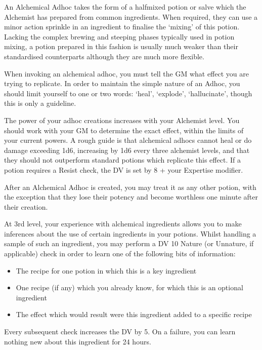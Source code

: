{
	An Alchemical Ad\minus{}hoc takes the form of a half\minus{}mixed potion or salve which the Alchemist has prepared from common ingredients. When required, they can use a minor action sprinkle in an ingredient to finalise the `mixing' of this potion. Lacking the complex brewing and steeping phases typically used in potion mixing, a potion prepared in this fashion is usually much weaker than their standardised counterparts \minus{} although they are much more flexible. 
	
	 When invoking an alchemical ad\minus{}hoc, you must tell the GM what effect you are trying to replicate. In order to maintain the simple nature of an Ad\minus{}hoc, you should limit yourself to one or two words: `heal', `explode', `hallucinate', though this is only a guideline. 
	 
	 The power of your ad\minus{}hoc creations increases with your Alchemist level. You should work with your GM to determine the exact effect, within the limits of your current powers. A rough guide is that alchemical ad\minus{}hocs cannot heal or do damage exceeding 1d6, increasing by 1d6 every three alchemist levels, and that they should not outperform standard potions which replicate this effect. If a potion requires a Resist check, the DV is set by 8 + your Expertise modifier. 
	 
	 After an Alchemical Ad\minus{}hoc is created, you may treat it as any other potion, with the exception that they lose their potency and become worthless one minute after their creation. 
}

{
	At 3rd level, your experience with alchemical ingredients allows you to make inferences about the use of certain ingredients in your potions. Whilst handling a sample of such an ingredient, you may perform a DV 10 Nature (or Un\minus{}nature, if applicable) check in order to learn one of the following bits of information:
	
	\begin{itemize}
		\item The recipe for one potion in which this is a key ingredient
		\item One recipe (if any) which you already know, for which this is an optional ingredient
		\item The effect which would result were this ingredient added to a specific recipe
	\end{itemize}
	
	Every subsequent check increases the DV by 5. On a failure, you can learn nothing new about this ingredient for 24 hours.
}

